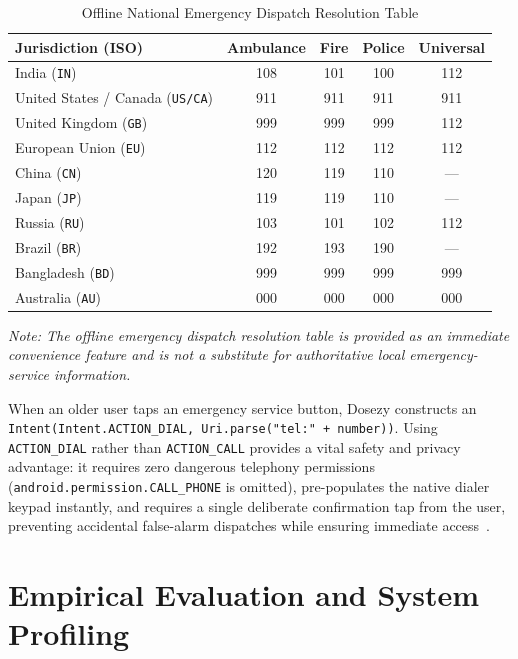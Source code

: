 \documentclass[11pt,a4paper]{article}
\begin{document}
\begin{table}[htbp]
\centering
\small
\caption{Offline National Emergency Dispatch Resolution Table}
\label{tab:emergency_numbers}
\begin{tabular}{lcccc}
\toprule
\textbf{Jurisdiction (ISO)} & \textbf{Ambulance} & \textbf{Fire} & \textbf{Police} & \textbf{Universal} \\
\midrule
India (\texttt{IN}) & 108 & 101 & 100 & 112 \\
United States / Canada (\texttt{US/CA}) & 911 & 911 & 911 & 911 \\
United Kingdom (\texttt{GB}) & 999 & 999 & 999 & 112 \\
European Union (\texttt{EU}) & 112 & 112 & 112 & 112 \\
China (\texttt{CN}) & 120 & 119 & 110 & --- \\
Japan (\texttt{JP}) & 119 & 119 & 110 & --- \\
Russia (\texttt{RU}) & 103 & 101 & 102 & 112 \\
Brazil (\texttt{BR}) & 192 & 193 & 190 & --- \\
Bangladesh (\texttt{BD}) & 999 & 999 & 999 & 999 \\
Australia (\texttt{AU}) & 000 & 000 & 000 & 000 \\
\bottomrule
\end{tabular}
\end{table}

\emph{Note: The offline emergency dispatch resolution table is provided as an immediate convenience feature and is not a substitute for authoritative local emergency-service information.}

When an older user taps an emergency service button, Dosezy constructs an \texttt{Intent(Intent.ACTION\_DIAL, Uri.parse("tel:" + number))}. Using \texttt{ACTION\_DIAL} rather than \texttt{ACTION\_CALL} provides a vital safety and privacy advantage: it requires zero dangerous telephony permissions (\texttt{android.permission.CALL\_PHONE} is omitted), pre-populates the native dialer keypad instantly, and requires a single deliberate confirmation tap from the user, preventing accidental false-alarm dispatches while ensuring immediate access~\cite{etsi2020emergency,itu2008emergency}.

\section{Empirical Evaluation and System Profiling}
\label{sec:evaluation}
\end{document}
